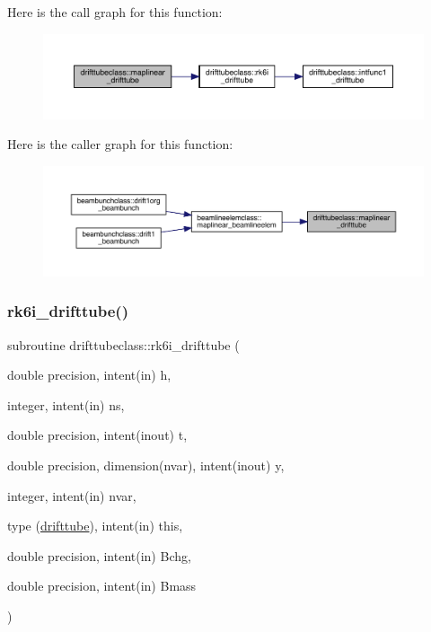 Here is the call graph for this function\+:\nopagebreak
\begin{figure}[H]
\begin{center}
\leavevmode
\includegraphics[width=350pt]{namespacedrifttubeclass_aaf41c0aaec4dc3e16fc0f678b3220de3_cgraph}
\end{center}
\end{figure}
Here is the caller graph for this function\+:\nopagebreak
\begin{figure}[H]
\begin{center}
\leavevmode
\includegraphics[width=350pt]{namespacedrifttubeclass_aaf41c0aaec4dc3e16fc0f678b3220de3_icgraph}
\end{center}
\end{figure}
\mbox{\label{namespacedrifttubeclass_a186a18efb61fce23e16a18534af446fb}} 
\subsubsection{\texorpdfstring{rk6i\_drifttube()}{rk6i\_drifttube()}}
{\footnotesize\ttfamily subroutine drifttubeclass\+::rk6i\+\_\+drifttube (\begin{DoxyParamCaption}\item[{double precision, intent(in)}]{h,  }\item[{integer, intent(in)}]{ns,  }\item[{double precision, intent(inout)}]{t,  }\item[{double precision, dimension(nvar), intent(inout)}]{y,  }\item[{integer, intent(in)}]{nvar,  }\item[{type (\mbox{\hyperlink{namespacedrifttubeclass_structdrifttubeclass_1_1drifttube}{drifttube}}), intent(in)}]{this,  }\item[{double precision, intent(in)}]{Bchg,  }\item[{double precision, intent(in)}]{Bmass }\end{DoxyParamCaption})}

